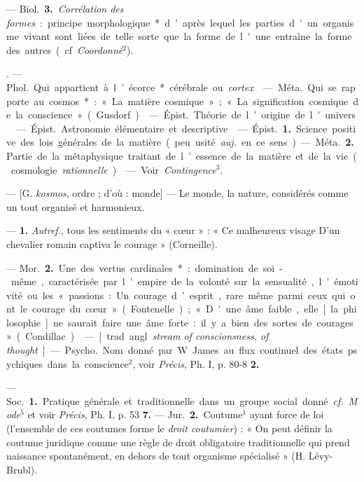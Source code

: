 \begin{itemize}[leftmargin=1cm, label=, itemsep=11pt]
— \si{Biol.} {\bf 3.} {\it Corrélation des formes} :
principe morphologique* d’après lequel les parties d’un organisme
vivant sont liées de telle sorte que
la forme de l'une entraîne la forme
des autres (cf. {\it Coordonné}$^2$).

. — \si{Phol.} Qui. appartient à
l’écorce* cérébrale ou {\it cortex}.

 — \si{Méta.} Qui se rapporte au
cosmos* : « La matière cosmique » ;
« La signification cosmique de la
conscience » (Gusdorf).

 — \si{Épist.} Théorie de
l’origine de l'univers.

. — \si{Épist.} Astronomie
élémentaire et descriptive.

 — \si{Épist.} {\bf 1.} Science positive des lois générales de la matière
(peu usité {\it auj.} en ce sens). — \si{Méta.}
 {\bf 2.} Partie de la métaphysique traitant de l’essence de la matière et de
la vie (cosmologie {\it rationnelle}).

 — Voir {\it Contingence}$^3$.

 — [G. {\it kosmos}, ordre ; d'où :
monde] — Le monde, la nature,
considérés comme un tout organisé
et harmonieux.

 — {\bf 1.} {\it Autref.}, tous les sentiments du « cœur » : « Ce malheureux
visage D'un chevalier romain captiva
le courage » (Corneille).

— \si{Mor.} {\bf 2.} Une des vertus cardinales* : domination de soi-même,
caractérisée par l'empire de la volonté sur la sensualité, l'émotivité
ou les « passions : Un courage d’esprit, rare même parmi ceux qui ont
le courage du cœur » (Fontenelle);
« D'une âme faible, elle [la philosophie] ne saurait faire une âme
forte : il y a bien des sortes de courages » (Condillac).

 —
[trad. angl. {\it stream of conscionsness,
of thought}] — \si{Psycho.} Nom donné
par W. James au flux continuel des
états psychiques dans la conscience$^2$,
voir  {\it Précis}, Ph. I, p. 80-8 {\bf 2.}

 — \si{Soc.} {\bf 1.} Pratique générale
et traditionnelle dans un groupe
social donné. {\it cf.} {\it Mode}$^5$ et voir
 {\it Précis}, Ph. I, p. 53 {\bf 7.} — \si{Jur.} {\bf 2.} Coutume$^1$ ayant force de loi (l’ensemble
de ces coutumes forme le {\it droit coutumier}) : « On peut définir la coutume juridique comme une règle de
droit obligatoire traditionnelle qui
prend naissance spontanément, en
dehors de tout organisme spécialisé » (H. Lévy-Brubl).


\end{itemize}
